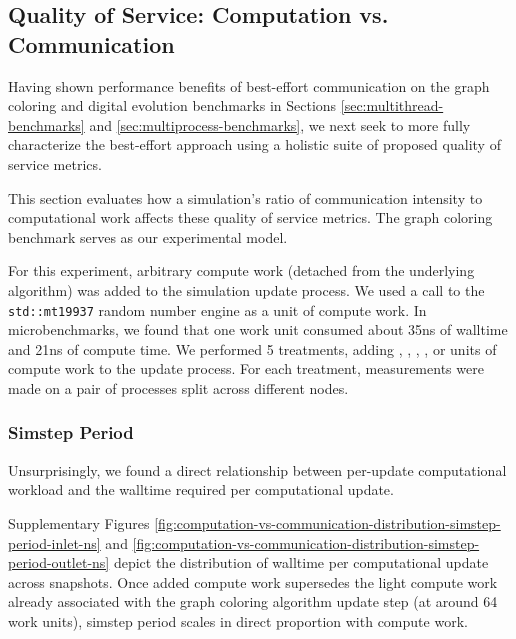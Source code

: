 \subsection{Quality of Service: Computation vs. Communication}
\label{sec:computation-vs-communication}



Having shown performance benefits of best-effort communication on the graph coloring and digital evolution benchmarks in Sections \ref{sec:multithread-benchmarks} and \ref{sec:multiprocess-benchmarks}, we next seek to more fully characterize the best-effort approach using a holistic suite of proposed quality of service metrics.

This section evaluates how a simulation's ratio of communication intensity to computational work affects these quality of service metrics.
The graph coloring benchmark serves as our experimental model.

For this experiment, arbitrary compute work (detached from the underlying algorithm) was added to the simulation update process.
We used a call to the \texttt{std::mt19937} random number engine as a unit of compute work.
In microbenchmarks, we found that one work unit consumed about 35ns of walltime and 21ns of compute time.
We performed 5 treatments, adding , , , , or  units of compute work to the update process.
For each treatment, measurements were made on a pair of processes split across different nodes.

\subsubsection{Simstep Period}

Unsurprisingly, we found a direct relationship between per-update computational workload and the walltime required per computational update.

Supplementary Figures \ref{fig:computation-vs-communication-distribution-simstep-period-inlet-ns} and \ref{fig:computation-vs-communication-distribution-simstep-period-outlet-ns} depict the distribution of walltime per computational update across snapshots.
Once added compute work supersedes the light compute work already associated with the graph coloring algorithm update step (at around 64 work units), simstep period scales in direct proportion with compute work.

